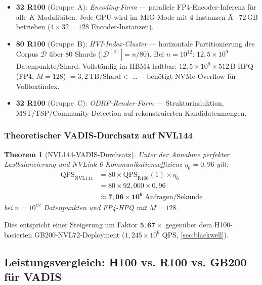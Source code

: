 ﻿\documentclass[12pt,a4paper]{article}
\newtheorem{theorem}{Theorem}[section]
\begin{document}
\begin{itemize}[leftmargin=1.4em, itemsep=2pt]
  \item \textbf{32 R100} (Gruppe~A): \emph{Encoding-Farm} ---
        parallele FP4-Encoder-Inferenz für alle $K$ Modalitäten.
        Jede GPU wird im MIG-Mode mit 4 Instanzen Ã  $72\,\text{GB}$
        betrieben ($4 \times 32 = 128$ Encoder-Instanzen).
  \item \textbf{80 R100} (Gruppe~B): \emph{HVI-Index-Cluster} ---
        horizontale Partitionierung des Corpus
        $\mathcal{D}$ über 80 Shards ($|\mathcal{D}^{(g)}| = n/80$).
        Bei $n = 10^{12}$: $12{,}5 \times 10^9$ Datenpunkte/Shard.
        Vollständig im HBM4 haltbar: $12{,}5 \times 10^9 \times 512\,\text{B}$
        HPQ (FP4, $M=128$) $= 3{,}2\,\text{TB/Shard} <$ \ldots --- 
        benötigt NVMe-Overflow für Volltextindex.
  \item \textbf{32 R100} (Gruppe~C): \emph{ODRP-Render-Farm} ---
        Strukturinduktion, MST/TSP/Communi\-ty-Detection
        auf rekonstruierten Kandidatenmengen.
\end{itemize}

\subsubsection{Theoretischer VADIS-Durchsatz auf NVL144}

\begin{theorem}[NVL144-VADIS-Durchsatz]
\label{thm:nvl144_throughput}
Unter der Annahme perfekter Lastbalancierung und
NVLink-6-Kommunikationseffizienz $\eta_6 = 0{,}96$ gilt:
\begin{align}
  \text{QPS}_{\text{NVL144}} &=
  80 \times \text{QPS}_{\text{R100}}(1) \times \eta_6 \\
  &= 80 \times 92{,}000 \times 0{,}96 \\
  &\approx \mathbf{7{,}06 \times 10^6}\;\text{Anfragen/Sekunde}
\end{align}
bei $n = 10^{12}$ Datenpunkten und FP4-HPQ mit $M=128$.
\end{theorem}

\noindent Dies entspricht einer Steigerung um Faktor $\mathbf{5{,}67\times}$
gegenüber dem H100-basierten GB200-NVL72-Deployment
($1{,}245 \times 10^6$ QPS, \cref{sec:blackwell}).

\subsection{Leistungsvergleich: H100 vs. R100 vs. GB200 für VADIS}
\label{sub:r100_comparison}
\end{document}
